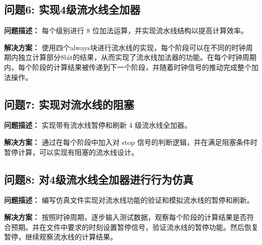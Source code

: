 \subsection{问题6: 实现4级流水线全加器}
\textbf{问题描述：} 每个级别进行 8 位加法运算，并实现流水线结构以提高计算效率。

\textbf{解决方案：} 使用四个always块进行流水线的实现，每个阶段可以在不同的时钟周期内独立计算部分8bit的结果，从而实现了流水线加法器的功能。在每个时钟周期内，每个阶段的计算结果被传递到下一个阶段，并随着时钟信号的推动完成整个加法操作。

\subsection{问题7: 实现对流水线的阻塞}
\textbf{问题描述：} 实现带有流水线暂停和刷新 4 级流水线全加器。

\textbf{解决方案：} 通过在每个阶段中加入对 stop 信号的判断逻辑，并在满足阻塞条件时暂停计算，可以实现有阻塞的流水线设计。

\subsection{问题8: 对4级流水线全加器进行行为仿真}
\textbf{问题描述：} 编写仿真文件实现对流水线功能的验证和模拟流水线的暂停和刷新。

\textbf{解决方案：} 按照时钟周期，逐步输入测试数据，观察每个阶段的计算结果是否符合预期。并在文件中要求的时刻设置暂停信号，验证流水线的暂停功能。然后恢复暂停，继续观察流水线的计算结果。